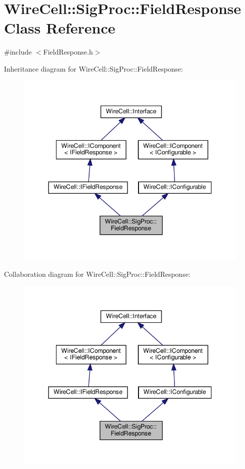 \hypertarget{class_wire_cell_1_1_sig_proc_1_1_field_response}{}\section{Wire\+Cell\+:\+:Sig\+Proc\+:\+:Field\+Response Class Reference}
\label{class_wire_cell_1_1_sig_proc_1_1_field_response}


{\ttfamily \#include $<$Field\+Response.\+h$>$}



Inheritance diagram for Wire\+Cell\+:\+:Sig\+Proc\+:\+:Field\+Response\+:
\nopagebreak
\begin{figure}[H]
\begin{center}
\leavevmode
\includegraphics[width=344pt]{class_wire_cell_1_1_sig_proc_1_1_field_response__inherit__graph}
\end{center}
\end{figure}


Collaboration diagram for Wire\+Cell\+:\+:Sig\+Proc\+:\+:Field\+Response\+:
\nopagebreak
\begin{figure}[H]
\begin{center}
\leavevmode
\includegraphics[width=344pt]{class_wire_cell_1_1_sig_proc_1_1_field_response__coll__graph}
\end{center}
\end{figure}
